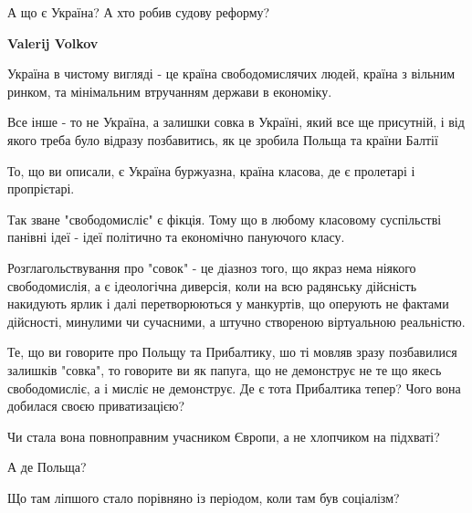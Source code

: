 \begin{itemize}
\begin{itemize}
 
А що є Україна?
А хто робив судову реформу?

 
\textbf{Valerij Volkov} 

Україна в чистому вигляді - це країна свободомислячих людей, країна з вільним
ринком, та мінімальним втручанням держави в економіку.

Все інше - то не Україна, а залишки совка в Україні, який все ще присутній, і
від якого треба було відразу позбавитись, як це зробила Польща та країни Балтії


 

То, що ви описали, є Україна буржуазна, країна класова, де є пролетарі і
пропрієтарі.

Так зване "свободомисліє" є фікція. Тому що в любому класовому суспільстві
панівні ідеї - ідеї політично та економічно пануючого класу.

Розглагольствування про "совок" - це діазноз того, що якраз нема ніякого
свободомислія, а є ідеологічна диверсія, коли на всю радянську дійсність
накидують ярлик і далі перетворюються у манкуртів, що оперують не фактами
дійсності, минулими чи сучасними, а штучно створеною віртуальною реальністю.

Те, що ви говорите про Польщу та Прибалтику, шо ті мовляв зразу позбавилися
залишків "совка", то говорите ви як папуга, що не демонструє не те що якесь
свободомисліє, а і мисліє не демонструє. Де є тота Прибалтика тепер? Чого вона
добилася своєю приватизацією?

Чи стала вона повноправним учасником Європи, а не хлопчиком на підхваті?

А де Польща?

Що там ліпшого стало порівняно із періодом, коли там був соціалізм?


\end{itemize}
\end{itemize}
